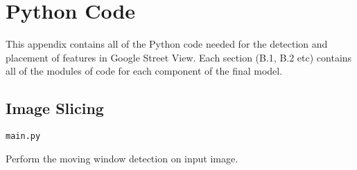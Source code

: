 
\chapter{Python Code}

\label{AppendixB}

This appendix contains all of the Python code needed for the detection and placement of features in Google Street View. Each section (B.1, B.2 etc) contains all of the modules of code for each component of the final model.

\section{Image Slicing}\label{slicing}

\verb|main.py|

Perform the moving window detection on input image.

